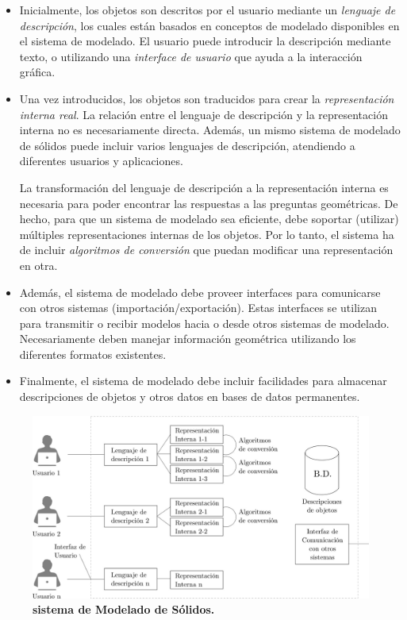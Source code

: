 \begin{itemize}
\item Inicialmente, los objetos son descritos por el usuario mediante un \textit{lenguaje de descripción}, los cuales están basados en conceptos de modelado disponibles en el sistema de modelado. El usuario puede introducir la descripción mediante texto, o utilizando una \textit{interface de usuario} que ayuda a la interacción gráfica.

\item Una vez introducidos, los objetos son traducidos para crear la \textit{representación interna real}. La relación entre el lenguaje de descripción y la representación interna no es necesariamente directa. Además, un mismo sistema de modelado de sólidos puede incluir varios lenguajes de descripción, atendiendo a diferentes usuarios y aplicaciones.


 La transformación del lenguaje de descripción a la representación interna es necesaria para poder encontrar las respuestas a las preguntas geométricas. De hecho, para que un sistema de modelado sea eficiente, debe soportar (utilizar) múltiples representaciones internas de los objetos. Por lo tanto, el sistema ha de incluir \textit{algoritmos de conversión} que puedan modificar una representación en otra.
 
 \item Además, el sistema de modelado debe proveer interfaces para comunicarse con otros sistemas (importación/exportación). Estas interfaces se utilizan para transmitir o recibir modelos hacia o desde otros sistemas de modelado. Necesariamente deben manejar información geométrica utilizando los diferentes formatos existentes.
 
\item Finalmente, el sistema de modelado debe incluir facilidades para almacenar descripciones de objetos y otros datos en bases de datos permanentes.

\end{itemize}

\begin{figure}[h]
\includegraphics[width=16cm]{Img/GEO/geo-sistema.jpg}
\centering
\caption{\textbf{ \footnotesize{sistema de Modelado de Sólidos. }}}
\end{figure}




